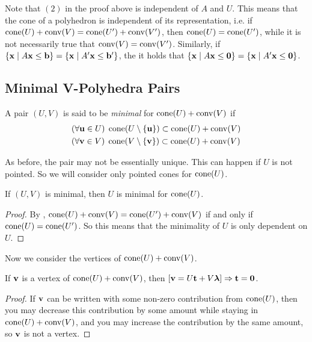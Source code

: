 \begin{Remark}\label{re_characteristic_cone}  Note that $(2)$ in the proof above is independent of $A$ and $U$.  This means that the cone of a polyhedron is independent of its representation, i.e. if $\operatorname{cone}(U) + \operatorname{conv}(V) = \operatorname{cone}(U') + \operatorname{conv}(V')$, then $\operatorname{cone}(U) = \operatorname{cone}(U')$, while it is not necessarily true that $\operatorname{conv}(V) = \operatorname{conv}(V')$.  Similarly, if $\left\{\mathbf{x}\;|\; A\mathbf{x}\leq \mathbf{b}\right\} = \left\{\mathbf{x}\;|\; A'\mathbf{x}\leq \mathbf{b}'\right\}$, the it holds that $\left\{\mathbf{x}\;|\; A\mathbf{x}\leq\mathbf{0}\right\} = \left\{\mathbf{x}\;|\; A'\mathbf{x}\leq\mathbf{0}\right\}$.
\end{Remark}

\subsection{Minimal V-Polyhedra Pairs}

\begin{Def}
	A pair $(U,V)$ is said to be \textit{minimal} for $\operatorname{cone}(U) + \operatorname{conv}(V)$ if
	\begin{align}
		 & (\forall \mathbf{u}\in U)\;\operatorname{cone}(U\setminus\left\{\mathbf{u}\right\}) \subset \operatorname{cone}(U) + \operatorname{conv}(V) \\
		 & (\forall \mathbf{v}\in V)\;\operatorname{cone}(V\setminus\left\{\mathbf{v}\right\}) \subset \operatorname{cone}(U) + \operatorname{conv}(V)
	\end{align}
\end{Def}

As before, the pair may not be essentially unique.  This can happen if $U$ is not pointed.  So we will consider only pointed cones for $\operatorname{cone}(U)$.

\begin{Prop}\label{u_min}
	If $(U,V)$ is minimal, then $U$ is minimal for $\operatorname{cone}(U)$.
\end{Prop}

\begin{proof}
	By , $\operatorname{cone}(U) + \operatorname{conv}(V) = \operatorname{cone}(U') + \operatorname{conv}(V)$ if and only if $\operatorname{cone}(U) = \operatorname{cone}(U')$.  So this means that the minimality of $U$ is only dependent on $U$.
\end{proof}

Now we consider the vertices of $\operatorname{cone}(U) + \operatorname{conv}(V)$.

\begin{Prop}\label{v_t_must_be_z}
	If $\mathbf{v}$ is a vertex of $\operatorname{cone}(U) + \operatorname{conv}(V)$, then $[\mathbf{v} = U\mathbf{t} + V\bm{\lambda}] \Rightarrow \mathbf{t} = \mathbf{0}$.
\end{Prop}

\begin{proof}
	If $\mathbf{v}$ can be written with some non-zero contribution from $\operatorname{cone}(U)$, then you may decrease this contribution by some amount while staying in $\operatorname{cone}(U) + \operatorname{conv}(V)$, and you may increase the contribution by the same amount, so $\mathbf{v}$ is not a vertex.
\end{proof}

